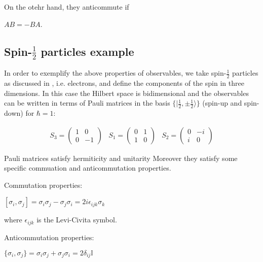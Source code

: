 \documentclass{Configuration_Files/PoliMi3i_thesis}
\begin{document}
On the otehr hand, they anticommute if 

\begin{center}
	$AB = - BA$. 
\end{center}


\subsection{Spin-$\frac{1}{2}$ particles example}

In order to exemplify the above properties of observables, we take spin-$\frac{1}{2}$ particles {as discussed in \cite{Cor23}}, i.e. electrons, and define the components of the spin in three dimensions. In this case the Hilbert space is bidimensional and the observables can be written in terms of Pauli matrices in the basis $\{ | \frac{1}{2}, \pm \frac{1}{2} \rangle \}$ (spin-up and spin-down) for $\hbar=1$:


\[
\begin{array}{ccc}
	\text{$S_3$} = 
	\begin{pmatrix}
		1 & 0 \\
		0 & -1
	\end{pmatrix} &
	\text{$S_1$} = 
	\begin{pmatrix}
		0 & 1 \\
		1 & 0
	\end{pmatrix} &
	\text{$S_2$} = 
	\begin{pmatrix}
		0 & -i \\
		i & 0
	\end{pmatrix}
\end{array}
\]

Pauli matrices satisfy hermiticity and unitarity Moreover they satisfy some specific commuation and anticommutation properties.

Commutation properties:

\begin{center}
	$[\sigma_i, \sigma_j] = \sigma_i \sigma_j - \sigma_j \sigma_i 
	= 2i\epsilon_{ijk} \sigma_k$
\end{center}

where $\epsilon_{ijk}$ is the Levi-Civita symbol. \newline

Anticommutation properties:

\begin{center}
	$\{\sigma_i, \sigma_j\} = \sigma_i \sigma_j + \sigma_j \sigma_i 
	= 2 \delta_{ij}\mathbb{I}$
\end{center}
\end{document}
